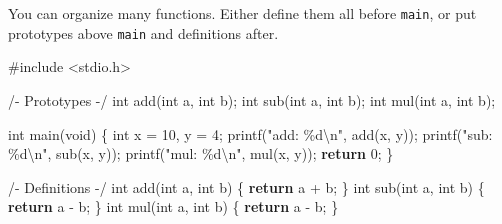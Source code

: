 \documentclass[
  letterpaper,
  DIV=11,
  numbers=noendperiod]{scrreprt}
\newenvironment{Shaded}{\begin{snugshade}}{\end{snugshade}}
\newcommand{\ControlFlowTok}[1]{\textcolor[rgb]{0.00,0.23,0.31}{\textbf{#1}}}
\newcommand{\DataTypeTok}[1]{\textcolor[rgb]{0.68,0.00,0.00}{#1}}
\newcommand{\DecValTok}[1]{\textcolor[rgb]{0.68,0.00,0.00}{#1}}
\newcommand{\ImportTok}[1]{\textcolor[rgb]{0.00,0.46,0.62}{#1}}
\newcommand{\NormalTok}[1]{\textcolor[rgb]{0.00,0.23,0.31}{#1}}
\newcommand{\OperatorTok}[1]{\textcolor[rgb]{0.37,0.37,0.37}{#1}}
\newcommand{\PreprocessorTok}[1]{\textcolor[rgb]{0.68,0.00,0.00}{#1}}
\newcommand{\SpecialCharTok}[1]{\textcolor[rgb]{0.37,0.37,0.37}{#1}}
\newcommand{\StringTok}[1]{\textcolor[rgb]{0.13,0.47,0.30}{#1}}
\begin{document}
You can organize many functions. Either define them all before
\texttt{main}, or put prototypes above \texttt{main} and definitions
after.

\begin{Shaded}
\begin{Highlighting}[]
\PreprocessorTok{\#include }\ImportTok{\textless{}stdio.h\textgreater{}}

\OperatorTok{/{-}}\NormalTok{ Prototypes }\OperatorTok{{-}/}
\DataTypeTok{int}\NormalTok{ add}\OperatorTok{(}\DataTypeTok{int}\NormalTok{ a}\OperatorTok{,} \DataTypeTok{int}\NormalTok{ b}\OperatorTok{);}
\DataTypeTok{int}\NormalTok{ sub}\OperatorTok{(}\DataTypeTok{int}\NormalTok{ a}\OperatorTok{,} \DataTypeTok{int}\NormalTok{ b}\OperatorTok{);}
\DataTypeTok{int}\NormalTok{ mul}\OperatorTok{(}\DataTypeTok{int}\NormalTok{ a}\OperatorTok{,} \DataTypeTok{int}\NormalTok{ b}\OperatorTok{);}

\DataTypeTok{int}\NormalTok{ main}\OperatorTok{(}\DataTypeTok{void}\OperatorTok{)} \OperatorTok{\{}
    \DataTypeTok{int}\NormalTok{ x }\OperatorTok{=} \DecValTok{10}\OperatorTok{,}\NormalTok{ y }\OperatorTok{=} \DecValTok{4}\OperatorTok{;}
\NormalTok{    printf}\OperatorTok{(}\StringTok{"add: }\SpecialCharTok{\%d\textbackslash{}n}\StringTok{"}\OperatorTok{,}\NormalTok{ add}\OperatorTok{(}\NormalTok{x}\OperatorTok{,}\NormalTok{ y}\OperatorTok{));}
\NormalTok{    printf}\OperatorTok{(}\StringTok{"sub: }\SpecialCharTok{\%d\textbackslash{}n}\StringTok{"}\OperatorTok{,}\NormalTok{ sub}\OperatorTok{(}\NormalTok{x}\OperatorTok{,}\NormalTok{ y}\OperatorTok{));}
\NormalTok{    printf}\OperatorTok{(}\StringTok{"mul: }\SpecialCharTok{\%d\textbackslash{}n}\StringTok{"}\OperatorTok{,}\NormalTok{ mul}\OperatorTok{(}\NormalTok{x}\OperatorTok{,}\NormalTok{ y}\OperatorTok{));}
    \ControlFlowTok{return} \DecValTok{0}\OperatorTok{;}
\OperatorTok{\}}

\OperatorTok{/{-}}\NormalTok{ Definitions }\OperatorTok{{-}/}
\DataTypeTok{int}\NormalTok{ add}\OperatorTok{(}\DataTypeTok{int}\NormalTok{ a}\OperatorTok{,} \DataTypeTok{int}\NormalTok{ b}\OperatorTok{)} \OperatorTok{\{} \ControlFlowTok{return}\NormalTok{ a }\OperatorTok{+}\NormalTok{ b}\OperatorTok{;} \OperatorTok{\}}
\DataTypeTok{int}\NormalTok{ sub}\OperatorTok{(}\DataTypeTok{int}\NormalTok{ a}\OperatorTok{,} \DataTypeTok{int}\NormalTok{ b}\OperatorTok{)} \OperatorTok{\{} \ControlFlowTok{return}\NormalTok{ a }\OperatorTok{{-}}\NormalTok{ b}\OperatorTok{;} \OperatorTok{\}}
\DataTypeTok{int}\NormalTok{ mul}\OperatorTok{(}\DataTypeTok{int}\NormalTok{ a}\OperatorTok{,} \DataTypeTok{int}\NormalTok{ b}\OperatorTok{)} \OperatorTok{\{} \ControlFlowTok{return}\NormalTok{ a }\OperatorTok{{-}}\NormalTok{ b}\OperatorTok{;} \OperatorTok{\}}
\end{Highlighting}
\end{Shaded}
\end{document}
